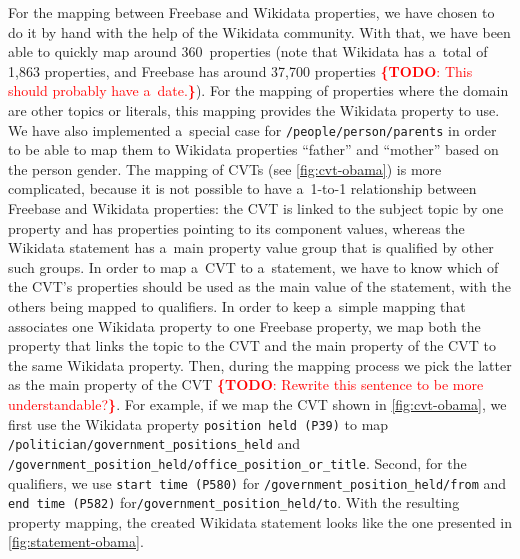\documentclass{acm_proc_article-sp}
\newcommand{\todo}[1]{\noindent\textcolor{red}{{\bf \{TODO}: #1{\bf \}}}}
\begin{document}
For the mapping between Freebase and Wikidata properties, we have chosen to do it by hand
with the help of the Wikidata community.
With that, we have been able to quickly map around 360~properties
(note that Wikidata has a~total of 1,863 properties, and Freebase has around 37,700 properties
\todo{This should probably have a~date.}).
For the mapping of properties where the domain are other topics or literals,
this mapping provides the Wikidata property to use.
We have also implemented a~special case for \texttt{/people/person/parents}
in order to be able to map them to Wikidata properties ``father'' and ``mother''
based on the person gender.
The mapping of CVTs (see \autoref{fig:cvt-obama}) is more complicated,
because it is not possible to have a~\mbox{1-to-1} relationship
between Freebase and Wikidata properties: the CVT is linked to the subject topic by one property
and has properties pointing to its component values, whereas the Wikidata statement
has a~main property value group that is qualified by other such groups.
In order to map a~CVT to a~statement, we have to know which of the CVT's properties
should be used as the main value of the statement, with the others being mapped to qualifiers.
In order to keep a~simple mapping that associates one Wikidata property to one Freebase property,
we map both the property that links the topic to the CVT
and the main property of the CVT to the same Wikidata property. Then, during the mapping process
we pick the latter as the main property of the CVT \todo{Rewrite this sentence to be more understandable?}.
For example, if we map the CVT shown in \autoref{fig:cvt-obama},
we first use the Wikidata property \texttt{position held (P39)} to map
\texttt{/politician/government\_positions\_held} and
\texttt{/government\_position\_held/office\_position\_or\_title}.
Second, for the qualifiers, we use \texttt{start time (P580)}
for \texttt{/government\_position\_held/from} and \texttt{end time (P582)}
for\linebreak \texttt{/government\_position\_held/to}.
With the resulting property mapping, the created Wikidata statement
looks like the one presented in \autoref{fig:statement-obama}.
\end{document}
